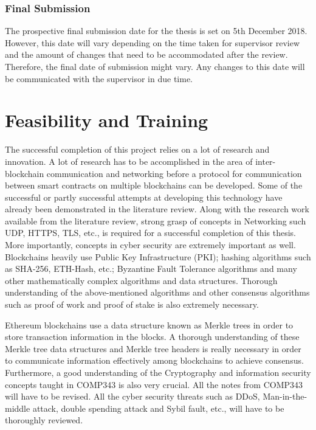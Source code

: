 \documentclass[a4paper,twoside,phd]{BYUPhys}
\begin{document}
\subsubsection{Final Submission}
The prospective final submission date for the thesis is set on 5th December 2018. However, this date will vary depending on the time taken for supervisor review and the amount of changes that need to be accommodated after the review. Therefore, the final date of submission might vary. Any changes to this date will be communicated with the supervisor in due time.

\section{Feasibility and Training}
The successful completion of this project relies on a lot of research and innovation. A lot of research has to be accomplished in the area of inter-blockchain communication and networking before a protocol for communication between smart contracts on multiple blockchains can be developed. Some of the successful or partly successful attempts at developing this technology have already been demonstrated in the literature review. Along with the research work available from the literature review, strong grasp of concepts in Networking such UDP, HTTPS, TLS, etc., is required for a successful completion of this thesis. More importantly, concepts in cyber security are extremely important as well. Blockchains heavily use Public Key Infrastructure (PKI); hashing algorithms such as SHA-256, ETH-Hash, etc.; Byzantine Fault Tolerance algorithms and many other mathematically complex algorithms and data structures. Thorough understanding of the above-mentioned algorithms and other consensus algorithms such as proof of work and proof of stake is also extremely necessary. \par
Ethereum blockchains use a data structure known as Merkle trees in order to store transaction information in the blocks. A thorough understanding of these Merkle tree data structures and Merkle tree headers is really necessary in order to communicate information effectively among blockchains to achieve consensus. Furthermore, a good understanding of the Cryptography and information security concepts taught in COMP343 is also very crucial. All the notes from COMP343 will have to be revised. All the cyber security threats such as DDoS, Man-in-the- middle attack, double spending attack and Sybil fault, etc., will have to be thoroughly reviewed.\par
\end{document}

